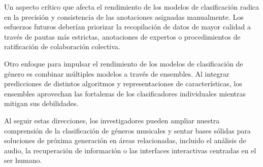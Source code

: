 \documentclass[colorinlistoftodos,twoside,twocolumn,10pt]{article} %
\begin{document}
Un aspecto cr\'itico que afecta el rendimiento de los modelos de clasificaci\'on radica en la precisi\'on y consistencia de las anotaciones asignadas manualmente. Los esfuerzos futuros deber\'ian priorizar la recopilaci\'on de datos de mayor calidad a trav\'es de pautas m\'as estrictas, anotaciones de expertos o procedimientos de ratificaci\'on de colaboraci\'on colectiva.

Otro enfoque para impulsar el rendimiento de los modelos de clasificaci\'on de g\'enero es combinar m\'ultiples modelos a trav\'es de ensembles. Al integrar predicciones de distintos algoritmos y representaciones de caracter\'isticas, los ensembles aprovechan las fortalezas de los clasificadores individuales mientras mitigan sus debilidades.  

  Al seguir estas direcciones, los investigadores pueden ampliar nuestra comprensi\'on de la clasificaci\'on de g\'eneros musicales y sentar bases s\'olidas para soluciones de pr\'oxima generaci\'on en \'areas relacionadas, incluido el an\'alisis de audio, la recuperaci\'on de informaci\'on o las interfaces interactivas centradas en el ser humano.
  
\end{document}
